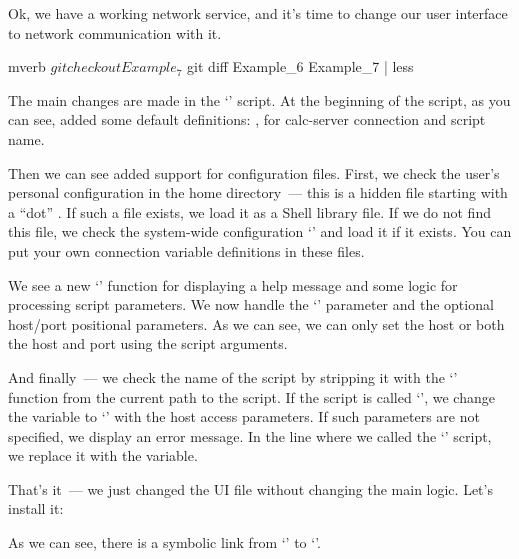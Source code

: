 Ok, we have a working network service, and it's time to change our user
interface to network communication with it.
\begin{code}{mverb}
$ git checkout Example_7
$ git diff Example_6 Example_7 | less
\end{code}
The main changes are made in the `' script. At the beginning of
the script, as you can see, added some default definitions: ,
 for calc-server connection and  script name.

Then we can see added support for configuration files. First, we check
the user's personal configuration in the home directory~--- this is a hidden
file starting with a ``dot'' . If such a file exists, we load it
as a Shell library file. If we do not find this file, we check the system-wide
configuration `' and load it if it exists.
You can put your own connection variable definitions in these files.

We see a new `' function for displaying a help message and some logic
for processing script parameters. We now handle the `'
parameter and the optional host/port positional parameters. As we can see,
we can only set the host or both the host and port using the script arguments.

And finally~--- we check the name of the script by stripping it with
the `' function from the current path to the script. If the script
is called `', we change the  variable to `'
with the host access parameters. If such parameters are not specified,
we display an error message. In the line where we called the `' script,
we replace it with the  variable.

That's it~--- we just changed the UI file without changing the main logic.
Let's install it:
As we can see, there is a symbolic link from `' to `'.

